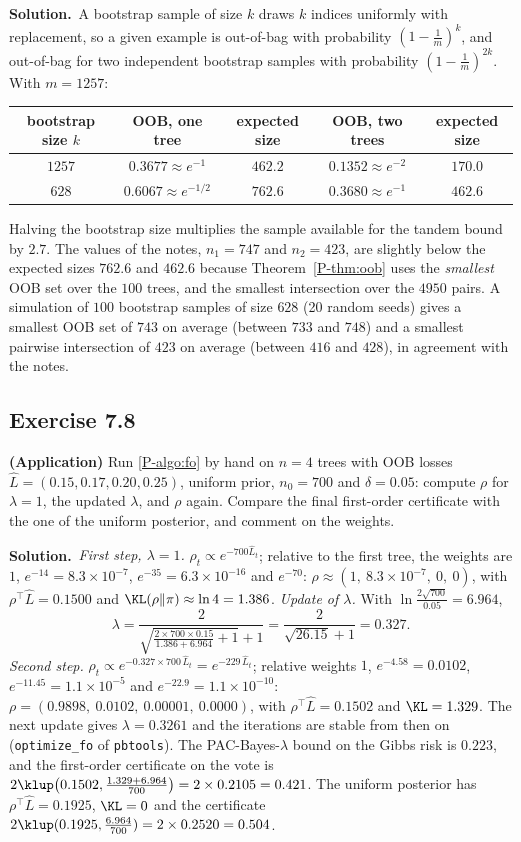 \documentclass[11pt]{article}
\newcommand{\statement}[1]{\begin{tcolorbox}[enhanced,breakable,colback=black!3,colframe=black!25,boxrule=0.4pt,sharp corners,fontupper=\itshape\small]#1\end{tcolorbox}}
\newcommand{\exo}[1]{\Needspace{6\baselineskip}\subsection*{Exercise #1}\addcontentsline{toc}{subsection}{Exercise #1}}
\newcommand{\sol}{\noindent\textbf{Solution.}\ }
\begin{document}
\sol A bootstrap sample of size $k$ draws $k$ indices uniformly with replacement, so a given example is out-of-bag with
probability $(1-\frac1m)^k$, and out-of-bag for two independent bootstrap samples with probability $(1-\frac1m)^{2k}$. With $m=1257$:
\begin{center}\small
\begin{tabular}{ccccc}
\toprule
bootstrap size $k$ & OOB, one tree & expected size & OOB, two trees & expected size \\
\midrule
$1257$ & $0.3677\approx e^{-1}$ & $462.2$ & $0.1352\approx e^{-2}$ & $170.0$ \\
$628$ & $0.6067\approx e^{-1/2}$ & $762.6$ & $0.3680\approx e^{-1}$ & $462.6$ \\
\bottomrule
\end{tabular}
\end{center}
Halving the bootstrap size multiplies the sample available for the tandem bound by $2.7$. The values of the notes, $n_1=747$
and $n_2=423$, are slightly below the expected sizes $762.6$ and $462.6$ because Theorem~\ref{P-thm:oob} uses the \emph{smallest}
OOB set over the $100$ trees, and the smallest intersection over the $4950$ pairs. A simulation of $100$ bootstrap
samples of size $628$ (20 random seeds) gives a smallest OOB set of $743$ on average (between $733$ and $748$) and a smallest
pairwise intersection of $423$ on average (between $416$ and $428$), in agreement with the notes.

\exo{7.8}
\statement{\textbf{(Application)} Run \cref{P-algo:fo} by hand on $n=4$ trees with OOB losses $\widehat L=(0.15,0.17,0.20,0.25)$, uniform prior,
$n_0=700$ and $\delta=0.05$: compute $\rho$ for $\lambda=1$, the updated $\lambda$, and $\rho$ again. Compare the final first-order certificate with
the one of the uniform posterior, and comment on the weights.}

\sol \emph{First step, $\lambda=1$.} $\rho_t\propto e^{-700\widehat L_t}$; relative to the first tree, the weights are $1$, $e^{-14}=8.3\times10^{-7}$,
$e^{-35}=6.3\times10^{-16}$ and $e^{-70}$: $\rho\approx(1,\ 8.3\times10^{-7},\ 0,\ 0)$, with $\rho^\top\widehat L=0.1500$ and
$\KL(\rho\|\pi)\approx\ln4=1.386$. \emph{Update of $\lambda$.} With $\ln\frac{2\sqrt{700}}{0.05}=6.964$,
\[
\lambda=\frac{2}{\sqrt{\frac{2\times700\times0.15}{1.386+6.964}+1}+1}=\frac{2}{\sqrt{26.15}+1}=0.327.
\]
\emph{Second step.} $\rho_t\propto e^{-0.327\times700\,\widehat L_t}=e^{-229\,\widehat L_t}$; relative weights $1$, $e^{-4.58}=0.0102$,
$e^{-11.45}=1.1\times10^{-5}$ and $e^{-22.9}=1.1\times10^{-10}$: $\rho=(0.9898,\ 0.0102,\ 0.00001,\ 0.0000)$, with $\rho^\top\widehat L=0.1502$ and $\KL=1.329$. The next
update gives $\lambda=0.3261$ and the iterations are stable from then on (\texttt{optimize\_fo} of \texttt{pbtools}). The
PAC-Bayes-$\lambda$ bound on the Gibbs risk is $0.223$, and the first-order certificate on the vote is
$2\klup\big(0.1502,\frac{1.329+6.964}{700}\big)=2\times0.2105=0.421$. The uniform posterior has $\rho^\top\widehat L=0.1925$, $\KL=0$ and the certificate
$2\klup(0.1925,\frac{6.964}{700})=2\times0.2520=0.504$.
\end{document}

